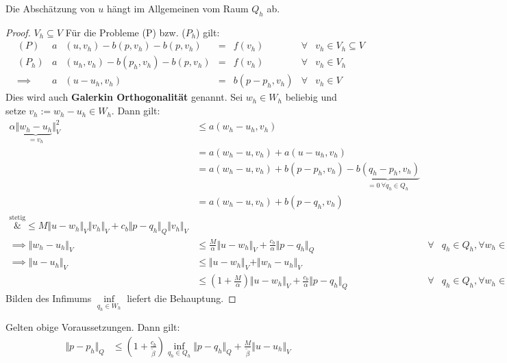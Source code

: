 \begin{bemerkung}
	Die Abschätzung von $u$ hängt im Allgemeinen vom Raum $Q_h$ ab.
\end{bemerkung}

\begin{proof}
	$V_h\subseteq V$
	Für die Probleme (P) bzw. ($P_h$) gilt:
	\begin{align*}
		&(P) &a&(u,v_h)-b(p,v_h)-b(p,v_h)&=&f(v_h) &\forall&v_h\in V_h\subseteq V\\
		&(P_h) &a&(u_h,v_h)-b(p_h,v_h)-b(p,v_h)&=&f(v_h) &\forall&v_h\in V_h\\
		&\implies
		&a&(u-u_h,v_h)&=&b(p-p_h,v_h) &\forall&v_h\in V
	\end{align*}
	Dies wird auch \textbf{Galerkin Orthogonalität} genannt.
	Sei $w_h\in W_h$ beliebig und setze $v_h:=w_h-u_h\in W_h$.
	Dann gilt:
	\begin{align*}
		\alpha\Vert\underbrace{w_h-u_h}_{=v_h}\Vert_V^2
		&\leq a(w_h-u_h,v_h)\\
		&=a(w_h-u,v_h)+a(u-u_h,v_h)\\
		&=a(w_h-u,v_h)+b(p-p_h,v_h)-\underbrace{b(q_h-p_h,v_h)}_{=0~\forall q_h\in Q_h}\\
		&=a(w_h-u,v_h)+b(p-q_h,v_h)\\
		\overset{\text{stetig}}&\leq
		M\Vert u-w_h\Vert_V\Vert v_h\Vert_V+c_b\Vert p-q_h\Vert_Q\Vert v_h\Vert_V\\
		\implies
		\Vert w_h-u_h\Vert_V
		&\leq \frac{M}{\alpha}\Vert u-w_h\Vert_V+\frac{c_b}{\alpha}\Vert p-q_h\Vert_Q &\forall& q_h\in Q_h,\forall w_h\in W_h\\
		\implies
		\Vert u-u_h\Vert_V
		&\leq\Vert u-w_h\Vert_V+\Vert w_h-u_h\Vert_V\\
		&\leq\left(1+\frac{M}{\alpha}\right)\Vert u-w_h\Vert_V+\frac{c_b}{\alpha}\Vert p-q_h\Vert_Q &\forall& q_h\in Q_h,\forall w_h\in W_h
	\end{align*}
	Bilden des Infimums $\inf\limits_{q_h\in W_h}$ liefert die Behauptung.
\end{proof}

\begin{theorem}
	Gelten obige Voraussetzungen. Dann gilt:
	\begin{align*}
		\Vert p-p_h\Vert_Q&\leq\left(1+\frac{c_b}{\tilde{\beta}}\right)\inf\limits_{q_h\in Q_h}\Vert p-q_h\Vert_Q+\frac{M}{\tilde{\beta}}\Vert u-u_h\Vert_V
	\end{align*}
\end{theorem}

